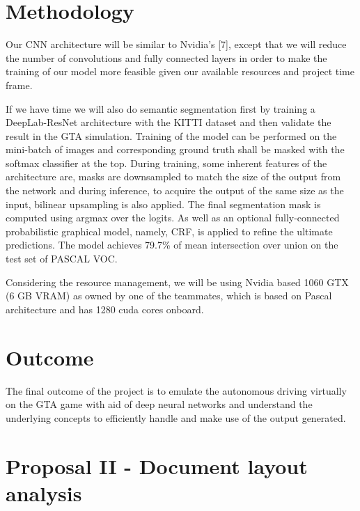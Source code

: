 \documentclass[10pt,twocolumn,letterpaper]{article}
\begin{document}
	\section{Methodology}
	Our CNN architecture will be similar to Nvidia's [7], except that we will reduce the number of convolutions and fully connected layers in order to make the training of our model more feasible given our available resources and project time frame.  
	
	If we have time we will also do semantic segmentation first by training a DeepLab-ResNet architecture with the KITTI dataset and then validate the result in the GTA simulation. Training of the model can be performed on the mini-batch of images and corresponding ground truth shall be masked with the softmax classifier at the top. During training, some inherent features of the architecture are, masks are downsampled to match the size of the output from the network and during inference, to acquire the output of the same size as the input, bilinear upsampling is also applied. The final segmentation mask is computed using argmax over the logits. As well as an optional fully-connected probabilistic graphical model, namely, CRF, is applied to refine the ultimate predictions. The model achieves 79.7\% of mean intersection over union on the test set of PASCAL VOC.
	
	Considering the resource management, we will be using Nvidia based 1060 GTX (6 GB VRAM) as owned by one of the teammates, which is based on Pascal architecture and has 1280 cuda cores onboard.
	
	\section{Outcome}
	The final outcome of the project is to emulate the autonomous driving virtually on the GTA game with aid of deep neural networks and understand the underlying concepts to efficiently handle and make use of the output generated.  
	
	
	\section*{Proposal II - Document layout analysis}
	\setcounter{section}{0}
	
\end{document}
